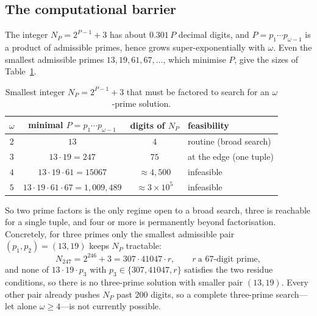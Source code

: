\documentclass[11pt,reqno]{amsart}
\theoremstyle{plain}
\theoremstyle{definition}
\theoremstyle{remark}
\begin{document}
\subsection{The computational barrier}
The integer $N_{P}=2^{P-1}+3$ has about $0.301\,P$ decimal digits, and $P=p_{1}\cdots
p_{\omega-1}$ is a product of admissible primes, hence grows super-exponentially with $\omega$.
Even the smallest admissible primes $13,19,61,67,\dots$, which minimise $P$, give the sizes of
Table~\ref{tab:growth}.

\begin{table}[h]
\centering
\small
\begin{tabular}{cccl}
\toprule
$\omega$ & minimal $P=p_{1}\cdots p_{\omega-1}$ & digits of $N_{P}$ & feasibility \\
\midrule
$2$ & $13$ & $4$ & routine (broad search) \\
$3$ & $13\cdot 19=247$ & $75$ & at the edge (one tuple) \\
$4$ & $13\cdot 19\cdot 61=15067$ & $\approx 4{,}500$ & infeasible \\
$5$ & $13\cdot 19\cdot 61\cdot 67=1{,}009{,}489$ & $\approx 3\times 10^{5}$ & infeasible \\
\bottomrule
\end{tabular}
\caption{Smallest integer $N_{P}=2^{P-1}+3$ that must be factored to search for an
$\omega$-prime solution.}
\label{tab:growth}
\end{table}

So two prime factors is the only regime open to a broad search, three is reachable for a single
tuple, and four or more is permanently beyond factorisation. Concretely, for three primes only
the smallest admissible pair $(p_{1},p_{2})=(13,19)$ keeps $N_{P}$ tractable:
\[
N_{247}=2^{246}+3=307\cdot 41047\cdot r,\qquad r\ \text{a 67-digit prime},
\]
and none of $13\cdot 19\cdot p_{3}$ with $p_{3}\in\{307,41047,r\}$ satisfies the two residue
conditions, so there is no three-prime solution with smaller pair $(13,19)$. Every other pair
already pushes $N_{P}$ past $200$ digits, so a complete three-prime search---let alone
$\omega\ge 4$---is not currently possible.
\end{document}
